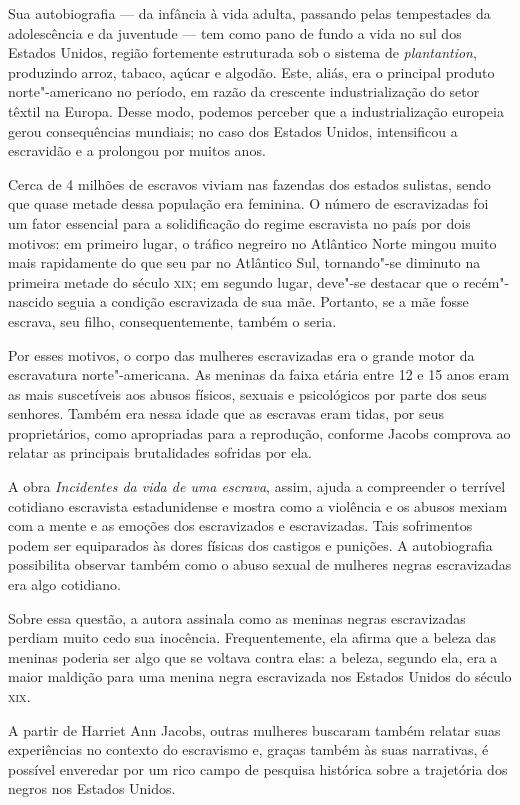 Sua autobiografia --- da infância à vida adulta, passando pelas tempestades da adolescência e da juventude --- tem como pano de fundo a vida no sul dos Estados Unidos, região
fortemente estruturada sob o sistema de \textit{plantantion}, produzindo
arroz, tabaco, açúcar e algodão. Este, aliás, era o principal produto
norte"-americano no período, em razão da crescente industrialização do
setor têxtil na Europa. Desse modo, podemos perceber que a
industrialização europeia gerou consequências mundiais; no caso dos
Estados Unidos, intensificou a escravidão e a prolongou por muitos anos.

Cerca de 4 milhões de escravos viviam nas fazendas dos estados sulistas,
sendo que quase metade dessa população era feminina. O número de
escravizadas foi um fator essencial para a solidificação do regime
escravista no país por dois motivos: em primeiro lugar, o tráfico
negreiro no Atlântico Norte mingou muito mais rapidamente do que seu par
no Atlântico Sul, tornando"-se diminuto na primeira metade do século \textsc{xix};
em segundo lugar, deve"-se destacar que o recém"-nascido seguia a condição
escravizada de sua mãe. Portanto, se a mãe fosse escrava, seu filho,
consequentemente, também o seria.

Por esses motivos, o corpo das mulheres escravizadas era o grande motor
da escravatura norte"-americana. As meninas da faixa etária entre 12 e 15
anos eram as mais suscetíveis aos abusos físicos, sexuais e psicológicos
por parte dos seus senhores. Também era nessa idade que as escravas eram
tidas, por seus proprietários, como apropriadas para a reprodução,
conforme Jacobs comprova ao relatar as principais brutalidades sofridas
por ela.


A obra \emph{Incidentes da vida de uma escrava}, assim, ajuda a
compreender o terrível cotidiano escravista estadunidense e mostra como
a violência e os abusos mexiam com a mente e as emoções dos escravizados
e escravizadas. Tais sofrimentos podem ser equiparados às dores físicas
dos castigos e punições. A autobiografia possibilita observar também
como o abuso sexual de mulheres negras escravizadas era algo cotidiano.

Sobre essa questão, a autora assinala como as meninas negras
escravizadas perdiam muito cedo sua inocência. Frequentemente, ela
afirma que a beleza das meninas poderia ser algo que se voltava contra
elas: a beleza, segundo ela, era a maior maldição para uma menina negra
escravizada nos Estados Unidos do século \textsc{xix}.

A partir de Harriet Ann Jacobs, outras mulheres buscaram também relatar
suas experiências no contexto do escravismo e, graças também às suas
narrativas, é possível enveredar por um rico campo de pesquisa histórica
sobre a trajetória dos negros nos Estados Unidos.

